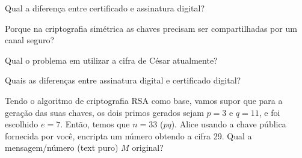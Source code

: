 \exercise Qual a diferença entre certificado e assinatura digital?

\exercise  Porque na criptografia simétrica as chaves precisam ser
compartilhadas por um canal seguro?

\exercise Qual o problema em utilizar a cifra de César
atualmente?

\exercise  Quais as diferenças entre assinatura digital e
certificado digital?

\exercise Tendo o algoritmo de criptografia RSA como base,
vamos supor que para a geração das suas chaves, os dois primos gerados
sejam $p=3$ e $q=11$, e foi escolhido $e=7$. Então, temos que $n=33$
($pq$). Alice usando a chave pública fornecida por você, encripta um
número obtendo a cifra 29. Qual a mensagem/número (text puro) $M$
original?


